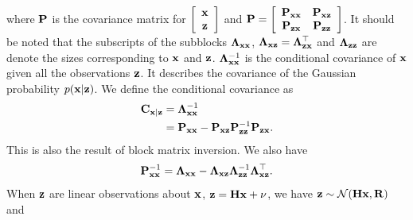 where $\bf P$ is the covariance matrix for $\left[                                             \begin{array}{c}
                                  {\bf x} \\
                                {\bf z} \\
                  \end{array}
                \right]$ and ${\bf P}=\left[
          \begin{array}{cc}
            {\bf P}_{\bf xx} & {\bf P}_{\bf xz} \\
            {\bf P}_{\bf zx} & {\bf P}_{\bf zz} \\
          \end{array}
        \right]$. It should be noted that the subscripts of the subblocks ${\bf \Lambda}_{\bf xx}$, ${\bf \Lambda}_{\bf xz}={\bf \Lambda}_{\bf zx}^\top$ and ${\bf \Lambda}_{\bf zz}$ are denote the sizes corresponding to $\bf x$ and $\bf z$. ${\bf \Lambda}_{\bf xx}^{-1}$ is the conditional covariance of $\bf x$ given all the observations $\bf z$. It describes the covariance of the Gaussian probability $p({\bf x}|{\bf z})$. We define the conditional covariance as
        \begin{equation}
        \begin{split}
        {\bf C}_{\bf x|z}&={\bf \Lambda}_{\bf xx}^{-1}\\
        &={\bf P}_{\bf xx}-{\bf P}_{\bf xz}{\bf P}_{\bf zz}^{-1}{\bf P}_{\bf zx}.
        \end{split}
        \end{equation}
This is also the result of block matrix inversion. We also have
\begin{equation}
{\bf P}_{\bf xx}^{-1}={\bf \Lambda}_{\bf xx}-{\bf \Lambda}_{\bf xz}{\bf \Lambda}_{\bf zz}^{-1}{\bf \Lambda}_{\bf xz}^\top.
\end{equation}
When ${\bf z}$ are linear observations about $\bf x$, ${\bf z}={\bf H}{\bf x}+{\bf \nu}$, we have ${\bf z}\sim\mathcal{N}({\bf H}{\bf x}, {\bf R})$ and
